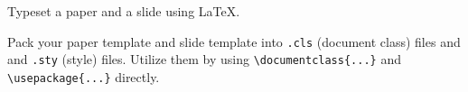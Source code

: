 \documentclass[english]{pkupaper}
\begin{document}
\begin{thmquestion}
Typeset a paper and a slide using \LaTeX.
\end{thmquestion}

\begin{thmquestion}
Pack your paper template and slide template into \verb".cls" (document class) files and and \verb".sty" (style) files. Utilize them by using \verb"\documentclass{...}" and \verb"\usepackage{...}" directly.
\end{thmquestion}

	
\end{document}
